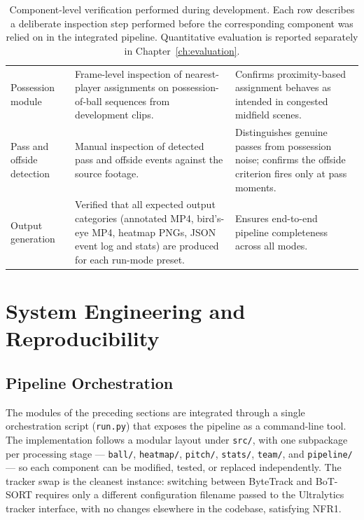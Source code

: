 \begin{table}[!htbp]
\begin{tabular}{
  >{\raggedright\arraybackslash}p{3.0cm}
  >{\raggedright\arraybackslash}p{6.4cm}
  >{\raggedright\arraybackslash}p{4.0cm}
}
Possession module & Frame-level inspection of nearest-player assignments on possession-of-ball sequences from development clips. & Confirms proximity-based assignment behaves as intended in congested midfield scenes. \\
Pass and offside detection & Manual inspection of detected pass and offside events against the source footage. & Distinguishes genuine passes from possession noise; confirms the offside criterion fires only at pass moments. \\
Output generation & Verified that all expected output categories (annotated MP4, bird's-eye MP4, heatmap PNGs, JSON event log and stats) are produced for each run-mode preset. & Ensures end-to-end pipeline completeness across all modes. \\
\bottomrule
\end{tabular}
\caption[Component-level verification performed during development.]{Component-level verification performed during development. Each row
describes a deliberate inspection step performed before the corresponding
component was relied on in the integrated pipeline. Quantitative evaluation
is reported separately in Chapter~\ref{ch:evaluation}.}
\label{tab:implementation_testing}
\end{table}

\section{System Engineering and Reproducibility}
\label{sec:methodology_system}

\subsection{Pipeline Orchestration}
\label{subsec:methodology_orchestration}

The modules of the preceding sections are integrated through a single
orchestration script (\texttt{run.py}) that exposes the pipeline as a
command-line tool. The implementation follows a modular layout under
\texttt{src/}, with one subpackage per processing stage --- \texttt{ball/},
\texttt{heatmap/}, \texttt{pitch/}, \texttt{stats/}, \texttt{team/}, and
\texttt{pipeline/} --- so each component can be modified, tested, or
replaced independently. The tracker swap is the cleanest instance:
switching between ByteTrack and BoT-SORT requires only a different
configuration filename passed to the Ultralytics tracker interface, with no
changes elsewhere in the codebase, satisfying NFR1.

